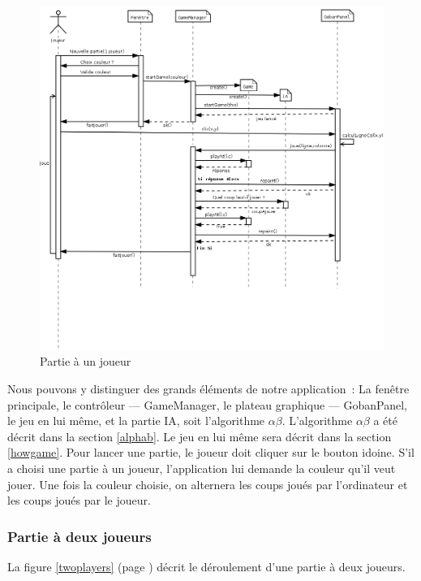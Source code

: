 \documentclass[11pt,a4paper,titlepage,french]{article}
\begin{document}
				\begin{figure}[ohbt]
					\begin{center}
						\includegraphics[width=1.1\textwidth]{./IA_1J.png}
					\end{center}
					\caption{Partie à un joueur}
					\label{oneplayer}
				\end{figure}


				Nous pouvons y distinguer des grands éléments de notre application~: La fenêtre principale, le contrôleur --- GameManager, le plateau graphique --- GobanPanel, le jeu en lui même, et la partie IA, soit l'algorithme $\alpha\beta$. L'algorithme $\alpha\beta$ a été décrit dans la section \ref{alphab}. Le jeu en lui même sera décrit dans la section \ref{howgame}. Pour lancer une partie, le joueur doit cliquer sur le bouton idoine. S'il a choisi une partie à un joueur, l'application lui demande la couleur qu'il veut jouer. Une fois la couleur choisie, on alternera les coups joués par l'ordinateur et les coups joués par le joueur.

			\subsubsection{Partie à deux joueurs}

				La figure \ref{twoplayers} (page \pageref{twoplayers}) décrit le déroulement d'une partie à deux joueurs.
\end{document}
